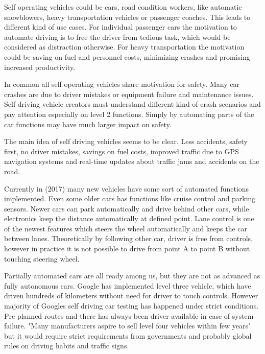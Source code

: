 \documentclass[english]{tktltiki}
\begin{document}
Self operating vehicles could be cars, road condition workers, like automatic 
snowblowers, heavy transportation vehicles or passenger coaches. This leads to 
different kind of use cases. For individual passenger cars the motivation to 
automate driving is to free the driver from tedious task, \cite{heavyvehicle} which would be 
considered as distraction otherwise. For heavy transportation the motivation 
could be saving on fuel and personnel costs, minimizing crashes and promising 
increased productivity.

In common all self operating vehicles share motivation for safety. \cite{heavyvehicle} Many car 
crashes are due to driver mistakes or equipment failure and maintenance issues. 
Self driving vehicle creators must understand different kind of crash scenarios 
and pay attention especially on level 2 functions. Simply by automating parts of 
the car functions may have much larger impact on safety.

The main idea of self driving vehicles seems to be clear. Less accidents, safety 
first, no driver mistakes, savings on fuel costs, improved traffic due to GPS 
navigation systems and real-time updates about traffic jams and accidents on the 
road.

Currently in (2017) many new vehicles have some sort of automated functions 
implemented. Even some older cars has functions like cruise control and parking 
sensors. Newer cars can park automatically and drive behind other cars, while 
electronics keep the distance automatically at defined point. Lane control is 
one of the newest features which steers the wheel automatically and keeps the 
car between lanes. Theoretically by following other car, driver is free from 
controls, however in practice it is not possible to drive from point A to point 
B without touching steering wheel.

Partially automated cars are all ready among us, but they are not as advanced as 
fully autonomous cars. Google has implemented level three vehicle, which have 
driven hundreds of kilometers without need for driver to touch controls. However 
majority of Googles self driving car testing has happened under strict 
conditions. Pre planned routes and there has always been driver available in 
case of system failure. \cite{transportpolicy} "Many manufacturers aspire to 
sell level four vehicles within few years" \cite{transportpolicy} but it would 
require strict requirements from governments and probably global rules on 
driving habits and traffic signs.   
\end{document}
